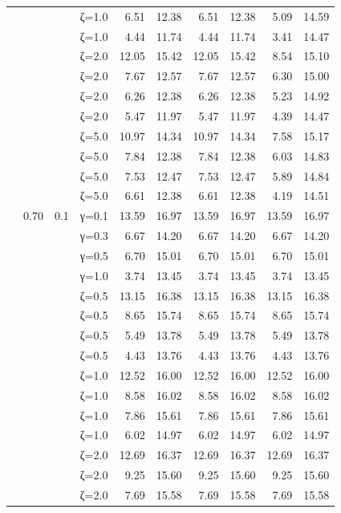 \begin{table}[htbp]
\begin{tabular}{ll r l  rr  rr  rr}
  &  &  & ζ=1.0 & 6.51 & 12.38 & 6.51 & 12.38 & 5.09 & 14.59 \\
  &  &  & ζ=1.0 & 4.44 & 11.74 & 4.44 & 11.74 & 3.41 & 14.47 \\
  &  &  & ζ=2.0 & 12.05 & 15.42 & 12.05 & 15.42 & 8.54 & 15.10 \\
  &  &  & ζ=2.0 & 7.67 & 12.57 & 7.67 & 12.57 & 6.30 & 15.00 \\
  &  &  & ζ=2.0 & 6.26 & 12.38 & 6.26 & 12.38 & 5.23 & 14.92 \\
  &  &  & ζ=2.0 & 5.47 & 11.97 & 5.47 & 11.97 & 4.39 & 14.47 \\
  &  &  & ζ=5.0 & 10.97 & 14.34 & 10.97 & 14.34 & 7.58 & 15.17 \\
  &  &  & ζ=5.0 & 7.84 & 12.38 & 7.84 & 12.38 & 6.03 & 14.83 \\
  &  &  & ζ=5.0 & 7.53 & 12.47 & 7.53 & 12.47 & 5.89 & 14.84 \\
  &  &  & ζ=5.0 & 6.61 & 12.38 & 6.61 & 12.38 & 4.19 & 14.51 \\
  & 0.70 & 0.1 & γ=0.1 & 13.59 & 16.97 & 13.59 & 16.97 & 13.59 & 16.97 \\
  &  &  & γ=0.3 & 6.67 & 14.20 & 6.67 & 14.20 & 6.67 & 14.20 \\
  &  &  & γ=0.5 & 6.70 & 15.01 & 6.70 & 15.01 & 6.70 & 15.01 \\
  &  &  & γ=1.0 & 3.74 & 13.45 & 3.74 & 13.45 & 3.74 & 13.45 \\
  &  &  & ζ=0.5 & 13.15 & 16.38 & 13.15 & 16.38 & 13.15 & 16.38 \\
  &  &  & ζ=0.5 & 8.65 & 15.74 & 8.65 & 15.74 & 8.65 & 15.74 \\
  &  &  & ζ=0.5 & 5.49 & 13.78 & 5.49 & 13.78 & 5.49 & 13.78 \\
  &  &  & ζ=0.5 & 4.43 & 13.76 & 4.43 & 13.76 & 4.43 & 13.76 \\
  &  &  & ζ=1.0 & 12.52 & 16.00 & 12.52 & 16.00 & 12.52 & 16.00 \\
  &  &  & ζ=1.0 & 8.58 & 16.02 & 8.58 & 16.02 & 8.58 & 16.02 \\
  &  &  & ζ=1.0 & 7.86 & 15.61 & 7.86 & 15.61 & 7.86 & 15.61 \\
  &  &  & ζ=1.0 & 6.02 & 14.97 & 6.02 & 14.97 & 6.02 & 14.97 \\
  &  &  & ζ=2.0 & 12.69 & 16.37 & 12.69 & 16.37 & 12.69 & 16.37 \\
  &  &  & ζ=2.0 & 9.25 & 15.60 & 9.25 & 15.60 & 9.25 & 15.60 \\
  &  &  & ζ=2.0 & 7.69 & 15.58 & 7.69 & 15.58 & 7.69 & 15.58 \\

\end{tabular}
\end{table}

